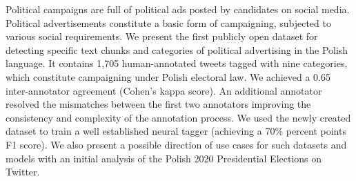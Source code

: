 Political campaigns are full of political ads posted by candidates on social media. Political advertisements constitute a basic form of campaigning, subjected to various social requirements. We present the first publicly open dataset for detecting specific text chunks and categories of political advertising in the Polish language. It contains 1,705 human-annotated tweets tagged with nine categories, which constitute campaigning under Polish electoral law. We achieved a 0.65 inter-annotator agreement (Cohen's kappa score). An additional annotator resolved the mismatches between the first two annotators improving the consistency and complexity of the annotation process. We used the newly created dataset to train a well established neural tagger (achieving a 70\% percent points F1 score). We also present a possible direction of use cases for such datasets and models with an initial analysis of the Polish 2020 Presidential Elections on Twitter.

